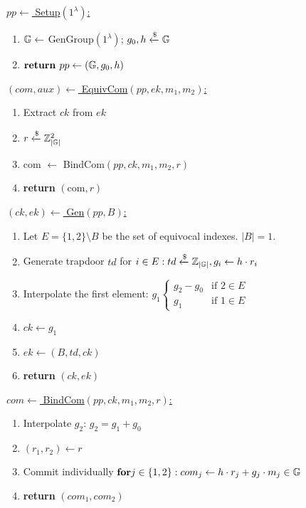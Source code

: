 \begin{figure}
  \centering
  \begin{construction}[]
    \begin{minipage}{0.45\linewidth}
      \underline{$pp \leftarrow$ Setup$(1^\lambda)$:}
      \begin{enumerate}
        \item $\mathbb{G} \leftarrow $ GenGroup$(1^\lambda)$; $g_0, h \xleftarrow{\$} \mathbb{G}$
        \item $\textbf{return } pp \leftarrow (\mathbb{G}, g_0, h)$
      \end{enumerate}  
    \end{minipage}
    \begin{minipage}{0.5\linewidth}
      \underline{$(com, aux) \leftarrow$ EquivCom$(pp, ek, m_1, m_2)$:}
      \begin{enumerate}
        \item Extract $ck$ from $ek$
        \item $r \xleftarrow{\$} \mathbb{Z}_{|\mathbb{G}|}^2$
        \item com $\leftarrow$ BindCom$(pp,ck,m_1,m_2,r)$
        \item \textbf{return} $(\text{com}, r)$
      \end{enumerate}  
    \end{minipage}

    \underline{$(ck, ek) \leftarrow$ Gen$(pp, B)$:}
    \begin{enumerate}
      \item Let $E = \{1,2\} \setminus B$ be the set of equivocal indexes. $|B| = 1$.
      \item Generate trapdoor $td$ for $i \in E: td \xleftarrow{\$} \mathbb{Z}_{|\mathbb{G}|}, g_i \leftarrow h \cdot r_i$
      \item Interpolate the first element: $g_1 \begin{cases}
       g_2 - g_0 & \text{if $2 \in E$} \\
       g_1 & \text{if $1 \in E$}
      \end{cases}$
      \item $ck \leftarrow g_1$
      \item $ek \leftarrow (B, td, ck)$
      \item \textbf{return} $(ck, ek)$
    \end{enumerate}

    \underline{$com \leftarrow$ BindCom$(pp,ck, m_1,m_2, r)$:}
    \begin{enumerate}
      \item Interpolate $g_2$: $g_2 = g_1 + g_0$
      \item $(r_1, r_2) \leftarrow r$
      \item Commit individually $\textbf{for} j \in \{1,2\}: com_j \leftarrow h\cdot r_j + g_j \cdot m_j \in \mathbb{G}$
      \item \textbf{return} $(com_1,com_2)$
    \end{enumerate}


\end{construction}
\end{figure}
